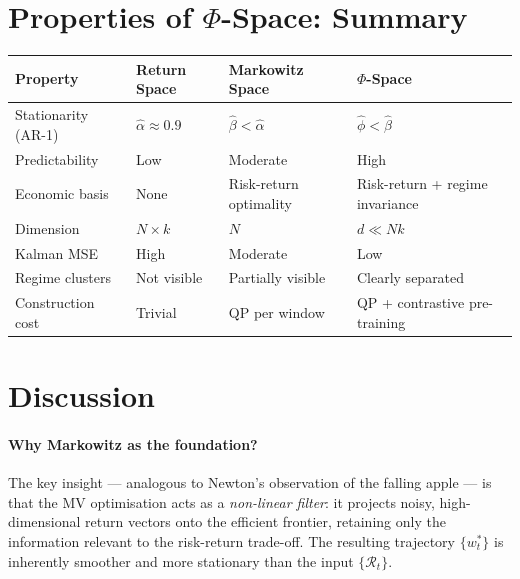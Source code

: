 \documentclass[12pt, a4paper]{report}
\theoremstyle{plain}
\theoremstyle{definition}
\newcommand{\calR}{\mathcal{R}}
\begin{document}
\section{Properties of \texorpdfstring{$\Phi$}{Phi}-Space: Summary}
\label{sec:properties}

\begin{center}
\renewcommand{\arraystretch}{1.5}
\begin{tabular}{p{3.5cm}p{3.5cm}p{3.5cm}p{3.5cm}}
\toprule
\textbf{Property} & \textbf{Return Space} & \textbf{Markowitz Space} & \textbf{$\Phi$-Space}\\
\midrule
Stationarity (AR-1) &
$\hat{\alpha} \approx 0.9$ &
$\hat{\beta} < \hat{\alpha}$ &
$\hat{\phi} < \hat{\beta}$ \\

Predictability &
Low &
Moderate &
High \\

Economic basis &
None &
Risk-return optimality &
Risk-return + regime invariance \\

Dimension &
$N \times k$ &
$N$ &
$d \ll Nk$ \\

Kalman MSE &
High &
Moderate &
Low \\

Regime clusters &
Not visible &
Partially visible &
Clearly separated \\

Construction cost &
Trivial &
QP per window &
QP + contrastive pre-training \\
\bottomrule
\end{tabular}
\end{center}



\section{Discussion}
\label{sec:discussion}

\paragraph{Why Markowitz as the foundation?}
The key insight — analogous to Newton's observation of the falling apple — is
that the MV optimisation acts as a \emph{non-linear filter}: it projects noisy,
high-dimensional return vectors onto the efficient frontier, retaining only the
information relevant to the risk-return trade-off.  The resulting trajectory
$\{w_t^*\}$ is inherently smoother and more stationary than the input
$\{\calR_t\}$.
\end{document}
